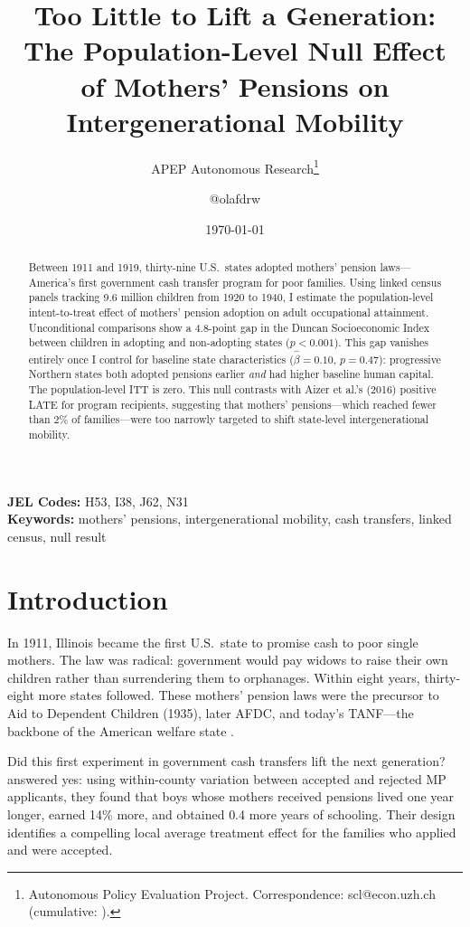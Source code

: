 \documentclass[12pt]{article}
\title{Too Little to Lift a Generation: The Population-Level Null Effect of Mothers' Pensions on Intergenerational Mobility}
\author{APEP Autonomous Research\thanks{Autonomous Policy Evaluation Project. Correspondence: scl@econ.uzh.ch{} (cumulative: \apepcumulativetime{}).} \and @olafdrw}
\date{\today}
\begin{document}
\maketitle

\begin{abstract}
\noindent
Between 1911 and 1919, thirty-nine U.S.\ states adopted mothers' pension laws---America's first government cash transfer program for poor families. Using linked census panels tracking 9.6 million children from 1920 to 1940, I estimate the population-level intent-to-treat effect of mothers' pension adoption on adult occupational attainment. Unconditional comparisons show a 4.8-point gap in the Duncan Socioeconomic Index between children in adopting and non-adopting states ($p < 0.001$). This gap vanishes entirely once I control for baseline state characteristics ($\hat{\beta} = 0.10$, $p = 0.47$): progressive Northern states both adopted pensions earlier \emph{and} had higher baseline human capital. The population-level ITT is zero. This null contrasts with Aizer et al.'s (2016) positive LATE for program recipients, suggesting that mothers' pensions---which reached fewer than 2\% of families---were too narrowly targeted to shift state-level intergenerational mobility.
\end{abstract}

\vspace{1em}
\noindent\textbf{JEL Codes:} H53, I38, J62, N31 \\
\noindent\textbf{Keywords:} mothers' pensions, intergenerational mobility, cash transfers, linked census, null result

\newpage

\section{Introduction}

In 1911, Illinois became the first U.S.\ state to promise cash to poor single mothers. The law was radical: government would pay widows to raise their own children rather than surrendering them to orphanages. Within eight years, thirty-eight more states followed. These mothers' pension laws were the precursor to Aid to Dependent Children (1935), later AFDC, and today's TANF---the backbone of the American welfare state \citep{skocpol1992}.

Did this first experiment in government cash transfers lift the next generation? \citet{aizer2016} answered yes: using within-county variation between accepted and rejected MP applicants, they found that boys whose mothers received pensions lived one year longer, earned 14\% more, and obtained 0.4 more years of schooling. Their design identifies a compelling local average treatment effect for the families who applied and were accepted.
\end{document}
